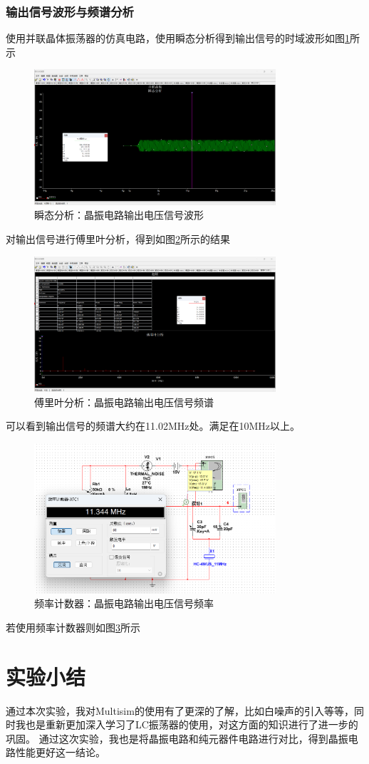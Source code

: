 \documentclass[UTF8]{ctexart}
\begin{document}
\subsubsection{输出信号波形与频谱分析}
使用并联晶体振荡器的仿真电路，使用瞬态分析得到输出信号的时域波形如图\ref{img:13}所示
\begin{figure}[htbp]
    \centering
    \includegraphics[width=0.8\textwidth]{13.png}
    \caption{瞬态分析：晶振电路输出电压信号波形}
    \label{img:13}
\end{figure}
对输出信号进行傅里叶分析，得到如图\ref{img:14}所示的结果
\begin{figure}[htbp]
    \centering
    \includegraphics[width=0.8\textwidth]{14.png}
    \caption{傅里叶分析：晶振电路输出电压信号频谱}
    \label{img:14}
\end{figure}
可以看到输出信号的频谱大约在11.02MHz处。满足在10MHz以上。
\begin{figure}[htbp]
    \centering
    \includegraphics[width=0.8\textwidth]{15.png}
    \caption{频率计数器：晶振电路输出电压信号频率}
    \label{img:15}
\end{figure}
若使用频率计数器则如图\ref{img:15}所示
\newpage
\section{实验小结}
通过本次实验，我对Multisim的使用有了更深的了解，比如白噪声的引入等等，同时我也是重新更加深入学习了LC振荡器的使用，对这方面的知识进行了进一步的巩固。
通过这次实验，我也是将晶振电路和纯元器件电路进行对比，得到晶振电路性能更好这一结论。
\end{document}
